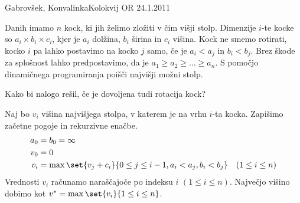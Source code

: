\begin{naloga}{Gabrovšek, Konvalinka}{Kolokvij OR 24.1.2011}
\begin{vprasanje}
Danih imamo $n$ kock, ki jih želimo zložiti v čim višji stolp.
Dimenzije $i$-te kocke so $a_i \times b_i \times c_i$,
kjer je $a_i$ dolžina, $b_i$ širina in $c_i$ višina.
Kock ne smemo rotirati,
kocko $i$ pa lahko postavimo na kocko $j$ samo,
če je $a_i < a_j$ in $b_i < b_j$.
Brez škode za splošnost lahko predpostavimo,
da je $a_1 \ge a_2 \ge \dots \ge a_n$.
S pomočjo dinamičnega programiranja poišči najvišji možni stolp.

Kako bi nalogo rešil, če je dovoljena tudi rotacija kock?
\end{vprasanje}

\begin{odgovor}
Naj bo $v_i$ višina najvišjega stolpa, v katerem je na vrhu $i$-ta kocka.
Zapišimo začetne pogoje in rekurzivne enačbe.
\begin{align*}
a_0 &= b_0 = \infty \\
v_0 &= 0 \\
v_i &= \max\set{v_j + c_i}{0 \le j \le i-1, a_i < a_j, b_i < b_j}
\quad (1 \le i \le n)
\end{align*}
Vrednosti $v_i$ računamo naraščajoče po indeksu $i$ $(1 \le i \le n)$.
Največjo višino dobimo kot $v^* = \max\set{v_i}{1 \le i \le n}$.

\medskip


\end{odgovor}
\end{naloga}
